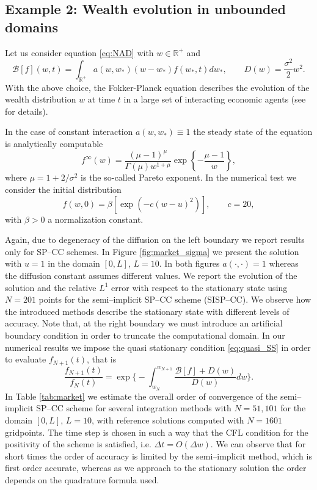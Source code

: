 \documentclass[a4paper]{article}
\theoremstyle{remark}\newtheorem{remark}{Remark}
\newcommand{\RR}{\mathbb{R}}
\newcommand{\B}{\mathcal{B}}
\newcommand{\be}{\begin{equation}}
\newcommand{\ee}{\end{equation}}
\begin{document}
\subsection{Example 2: Wealth evolution in unbounded domains}
Let us consider equation \eqref{eq:NAD} with $w\in\RR^+$ and
\be\label{eq:market_BD}
\B[f](w,t) = \int_{\RR^+} a(w,w_*)(w-w_*)f(w_*,t)dw_*, \qquad D(w) = \dfrac{\sigma^2}{2}w^2.
\ee
With the above choice, the Fokker-Planck equation describes the evolution of the wealth distribution $w$ at time $t$ in a large set of interacting economic agents (see \cite{NPT,PT2} for details).
 
In the case of constant interaction $a(w,w_*)\equiv 1$ the steady state of the equation is analytically computable 
\be\label{eq:market_anal}
f^{\infty}(w) = \dfrac{(\mu-1)^{\mu}}{\Gamma(\mu)w^{1+\mu}}\exp\left\{ -\dfrac{\mu-1}{w}  \right\},
\ee
where $\mu=1+2/\sigma^2$ is the so-called Pareto exponent. In the numerical test we consider the initial distribution
\be\label{eq:initial_market}
f(w,0) = \beta \left[ \exp\left(-c(w-u)^2\right) \right],\qquad c=20, 
\ee
with $\beta>0$ a normalization constant.

Again, due to degeneracy of the diffusion on the left boundary we report results only for SP--CC schemes.
In Figure \ref{fig:market_sigma} we present the solution with $u=1$ in the domain $[0,L]$, $L=10$. In both figures $a(\cdot,\cdot)= 1$ whereas the diffusion constant assumes different values. We report the evolution of the solution and the relative $L^1$ error with respect to the stationary state using $N=201$ points for the semi--implicit SP--CC scheme (SISP--CC). We observe how the introduced methods describe the stationary state with different levels of accuracy. Note that, at the right boundary we must introduce an artificial boundary condition in order to truncate the computational domain. In our numerical results we impose the quasi stationary condition \eqref{eq:quasi_SS} in order to evaluate $f_{N+1}(t)$, that is
\[
\dfrac{f_{N+1}(t)}{f_N(t)} = \exp\Big\{ -\int_{w_{N}}^{w_{N+1}} \dfrac{\B[f]+D(w)}{D(w)}dw \Big\}.
\]
In Table \ref{tab:market} we estimate the overall order of convergence of the semi--implicit SP--CC scheme for several integration methods with $N=51,101$ for the domain $[0,L]$, $L=10$, with reference solutions computed with $N=1601$ gridpoints. The time step is chosen in such a way that the CFL condition for the positivity of the scheme is satisfied, i.e. $\Delta t= O(\Delta w)$. We can observe that for short times the order of accuracy is limited by the semi--implicit method, which is first order accurate, whereas as we approach to the stationary solution the order depends on the quadrature formula used.  
\end{document}
